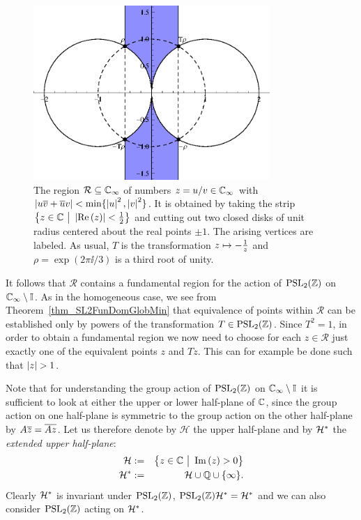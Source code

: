 \begin{figure}
\centering
\includegraphics[width=0.8\textwidth]{figures/minimal-region}
\caption[The region $\mathcal{R} \subseteq \EC$]{The region $\mathcal{R} \subseteq \EC$ of numbers $z = u/v \in \mathbb{C}_{\infty}$ with $\left|u\overline{v} + \overline{u}v\right| < \min\{\left|u\right|^2,\left|v\right|^2\}$. It is obtained by taking the strip $\big\{ z \in \mathbb{C} \ \big| \ \left|\operatorname{Re}\left(z\right)\right| < \frac{1}{2} \big\}$  and cutting out two closed disks of unit radius centered about the real points $\pm 1$. The arising vertices are labeled. As usual, $T$ is the transformation $z \mapsto -\frac{1}{z}$ and $\rho = \exp(2 \pi \ii / 3)$ is a third root of unity.}
\label{fig_PSL2MinRegion}
\end{figure}
It follows that $\mathcal{R}$ contains a fundamental region for the action of $\operatorname{PSL}_{2}(\mathbb{Z})$ on $\mathbb{C}_{\infty} \setminus \mathbb{I}$. As in the homogeneous case, we see from Theorem~\ref{thm_SL2FunDomGlobMin} that equivalence of points within $\mathcal{R}$ can be established only by powers of the transformation $T \in \operatorname{PSL}_{2}(\mathbb{Z})$. Since $T^2 = 1$, in order to obtain a fundamental region we now need to choose for each $z \in \mathcal{R}$ just exactly one of the equivalent points $z$ and $Tz$. This can for example be done such that $\left|z\right| > 1$.

Note that for understanding the group action of $\operatorname{PSL}_{2}(\mathbb{Z})$ on $\mathbb{C}_{\infty} \setminus \mathbb{I}$ it is sufficient to look at either the upper or lower half-plane of $\mathbb{C}$, since the group action on one half-plane is symmetric to the group action on the other half-plane by $A\overline{z} = \overline{Az}$. Let us therefore denote by $\mathcal{H}$ the upper half-plane and by $\mathcal{H}^\ast$ the \emph{extended upper half-plane}:
\begin{eqnarray}
\label{eqn_Upperhalfplane}\mathcal{H} &:=& \big\{ z \in \mathbb{C} \ \big| \ \operatorname{Im}\left(z\right) > 0 \big\} \\
\label{eqn_ExtUpperhalfplane}
\mathcal{H}^\ast &:=& \mathcal{H} \cup \mathbb{Q} \cup \{\infty\}.
\end{eqnarray}
Clearly $\mathcal{H}^\ast$ is invariant under $\operatorname{PSL}_{2}(\mathbb{Z})$, \ie $\operatorname{PSL}_{2}(\mathbb{Z}) \mathcal{H}^\ast = \mathcal{H}^\ast$ and we can also consider $\operatorname{PSL}_{2}(\mathbb{Z})$ acting on $\mathcal{H}^\ast$.

